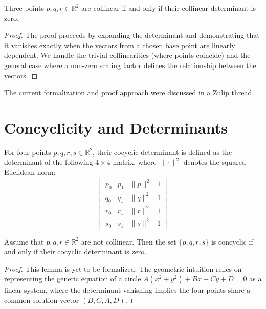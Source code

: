 \begin{lemma}
  \label{lem:collinear_iff_det_zero}
  Three points $p, q, r \in \mathbb{R}^2$ are collinear if and only if their collinear determinant is zero.
\end{lemma}

\begin{proof}
  \leanok
  The proof proceeds by expanding the determinant and demonstrating that it vanishes exactly when the vectors from a chosen base point are linearly dependent. We handle the trivial collinearities (where points coincide) and the general case where a non-zero scaling factor defines the relationship between the vectors.
\end{proof}

The current formalization and proof approach were discussed in a
\href{https://leanprover.zulipchat.com/#narrow/channel/113489-new-members/topic/Easy.20lemma.20on.20collinear.20points.20and.20determinants/with/571330618}{Zulip thread}.

\section{Concyclicity and Determinants}

\begin{definition}
  \label{def:cocyclic_det}
  For four points $p, q, r, s \in \mathbb{R}^2$, their cocyclic determinant is defined as the determinant of the following $4 \times 4$ matrix, where $\| \cdot \|^2$ denotes the squared Euclidean norm:
  $$
  \begin{vmatrix}
    p_0 & p_1 & \|p\|^2 & 1 \\
    q_0 & q_1 & \|q\|^2 & 1 \\
    r_0 & r_1 & \|r\|^2 & 1 \\
    s_0 & s_1 & \|s\|^2 & 1
  \end{vmatrix}
  $$
\end{definition}

\begin{lemma}
  \label{lem:cocyclic_iff_det_zero}
  Assume that $p, q, r \in \mathbb{R}^2$ are not collinear. Then the set $\{p, q, r, s\}$ is concyclic if and only if their cocyclic determinant is zero.
\end{lemma}

\begin{proof}
  This lemma is yet to be formalized. The geometric intuition relies on representing the generic equation of a circle $A(x^2 + y^2) + Bx + Cy + D = 0$ as a linear system, where the determinant vanishing implies the four points share a common solution vector $(B, C, A, D)$.
\end{proof}
